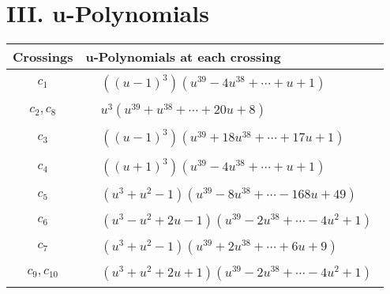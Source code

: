 \documentclass[1p]{elsarticle_modified}
\theoremstyle{definition}
\begin{document}
\newpage\renewcommand{\arraystretch}{1}
\centering \section*{ III. u-Polynomials}
\begin{tabular}{m{50pt}|m{274pt}}
Crossings & \hspace{64pt}u-Polynomials at each crossing \\
\hline $$\begin{aligned}c_{1}\end{aligned}$$&$\begin{aligned}
&((u-1)^3)(u^{39}-4 u^{38}+\cdots+u+1)
\end{aligned}$\\
\hline $$\begin{aligned}c_{2},c_{8}\end{aligned}$$&$\begin{aligned}
&u^3(u^{39}+u^{38}+\cdots+20 u+8)
\end{aligned}$\\
\hline $$\begin{aligned}c_{3}\end{aligned}$$&$\begin{aligned}
&((u-1)^3)(u^{39}+18 u^{38}+\cdots+17 u+1)
\end{aligned}$\\
\hline $$\begin{aligned}c_{4}\end{aligned}$$&$\begin{aligned}
&((u+1)^3)(u^{39}-4 u^{38}+\cdots+u+1)
\end{aligned}$\\
\hline $$\begin{aligned}c_{5}\end{aligned}$$&$\begin{aligned}
&(u^3+u^2-1)(u^{39}-8 u^{38}+\cdots-168 u+49)
\end{aligned}$\\
\hline $$\begin{aligned}c_{6}\end{aligned}$$&$\begin{aligned}
&(u^3- u^2+2 u-1)(u^{39}-2 u^{38}+\cdots-4 u^2+1)
\end{aligned}$\\
\hline $$\begin{aligned}c_{7}\end{aligned}$$&$\begin{aligned}
&(u^3+u^2-1)(u^{39}+2 u^{38}+\cdots+6 u+9)
\end{aligned}$\\
\hline $$\begin{aligned}c_{9},c_{10}\end{aligned}$$&$\begin{aligned}
&(u^3+u^2+2 u+1)(u^{39}-2 u^{38}+\cdots-4 u^2+1)
\end{aligned}$\\
\hline
\end{tabular}\newpage\renewcommand{\arraystretch}{1}
\end{document}
